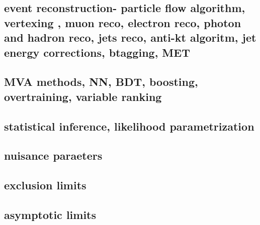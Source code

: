 \subsection{event reconstruction- particle flow algorithm, vertexing , muon reco, electron reco, photon and hadron reco, jets reco, anti-kt algoritm, jet energy corrections, btagging, MET  }
\subsection{ MVA methods, NN, BDT, boosting, overtraining, variable ranking  }
\subsection{statistical inference, likelihood parametrization}
\subsection{ nuisance paraeters}
\subsection{exclusion limits }
\subsection{asymptotic limits }


